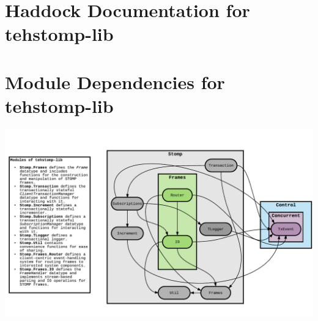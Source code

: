 \documentclass[conference, letterpaper]{IEEEtran}
\begin{document}
\begin{appendices}

\clearpage
\section{Haddock Documentation for tehstomp-lib}

\ifCLASSINFOpdf
    
    
\else
\fi

\section{Module Dependencies for tehstomp-lib}

\ifCLASSINFOpdf
    \includegraphics[scale=.8]{dependencies.pdf}
\else
\fi


\end{appendices}
\end{document}
